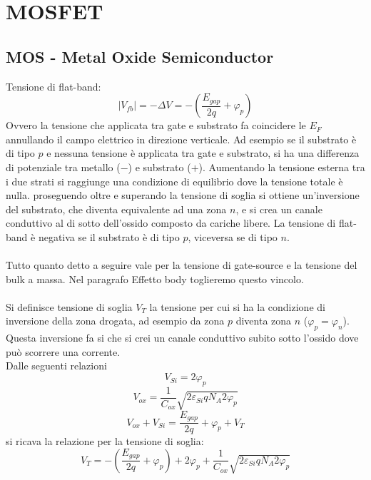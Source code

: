 \documentclass{article}
\begin{document}
\section*{MOSFET}
\subsection*{MOS - Metal Oxide Semiconductor}
Tensione di flat-band:
\begin{equation*}
|V_{fb}| = -\Delta V = - \left( \frac{E_{gap}}{2q} + \varphi_p \right)
\end{equation*}
Ovvero la tensione che applicata tra gate e substrato fa coincidere le $E_F$ annullando il campo elettrico in direzione verticale. Ad esempio se il substrato è di tipo $p$ e nessuna tensione è applicata tra gate e substrato, si ha una differenza di potenziale tra metallo ($-$) e substrato ($+$). Aumentando la tensione esterna tra i due strati si raggiunge una condizione di equilibrio dove la tensione totale è nulla. proseguendo oltre e superando la tensione di soglia si ottiene un'inversione del substrato, che diventa equivalente ad una zona $n$, e si crea un canale conduttivo al di sotto dell'ossido composto da cariche libere. La tensione di flat-band è negativa se il substrato è di tipo $p$, viceversa se di tipo $n$.\\
\\
Tutto quanto detto a seguire vale per la tensione di gate-source e la tensione del bulk a massa. Nel paragrafo Effetto body toglieremo questo vincolo.\\
\\
Si definisce tensione di soglia $V_T$ la tensione per cui si ha la condizione di inversione della zona drogata, ad esempio da zona $p$ diventa zona $n$ ($\varphi_p = \varphi_n$). Questa inversione fa si che si crei un canale conduttivo subito sotto l'ossido dove può scorrere una corrente.\\
Dalle seguenti relazioni
\begin{equation*}
V_{Si} = 2\varphi_p
\end{equation*}
\begin{equation*}
V_{ox} = \frac{1}{C_{ox}} \sqrt{2\varepsilon_{Si} q N_A 2\varphi_p}
\end{equation*}
\begin{equation*}
V_{ox} + V_{Si} = \frac{E_{gap}}{2q} + \varphi_p + V_T
\end{equation*}
si ricava la relazione per la tensione di soglia:
\begin{equation*}
V_T = -\left( \frac{E_{gap}}{2q} + \varphi_p \right) + 2\varphi_p + \frac{1}{C_{ox}}\sqrt{2\varepsilon_{Si} q N_A 2\varphi_p}
\end{equation*}
\end{document}
